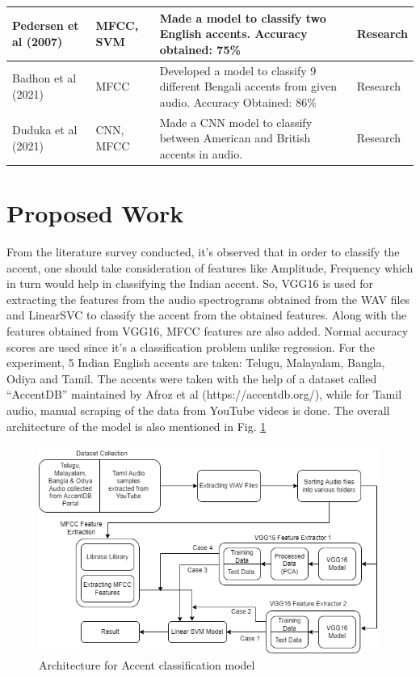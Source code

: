 \documentclass[pdflatex]{sn-jnl}%
\theoremstyle{thmstyleone}%
\theoremstyle{thmstyletwo}%
\theoremstyle{thmstylethree}%
\begin{document}
\begin{table}[!htp]
\begin{center}
{\begin{tabular}{p{3cm}p{3cm}p{4cm}p{3cm}}
			\hline
			Pedersen et al (2007) \cite{b16} & MFCC, SVM & Made a model to classify two English accents. Accuracy obtained: 75\% & Research \\
			\hline
			Badhon et al (2021) \cite{b17} & MFCC & Developed a model to classify 9 different Bengali accents from given audio. Accuracy Obtained: 86\% & Research \\
			\hline
			Duduka et al (2021) \cite{b19} & CNN, MFCC & Made a CNN model to classify between American and British accents in audio. & Research \\
			\hline
		\end{tabular}
	}
		\label{research1}
	\end{center}
\end{table}


\section{Proposed Work}\label{sec3}
From the literature survey conducted, it’s observed that in order to classify the accent, one should take consideration of features like Amplitude, Frequency which in turn would help in classifying the Indian accent. So, VGG16 is used for extracting the features from the audio spectrograms obtained from the WAV files and LinearSVC to classify the accent from
the obtained features. Along with the features obtained from VGG16, MFCC features are also added. Normal accuracy scores are used since it’s a classification problem unlike
regression. For the experiment, 5 Indian English accents are taken: Telugu, Malayalam, Bangla, Odiya and Tamil. The accents were taken with the help of a dataset called “AccentDB” maintained by Afroz et al \cite{b21} (https://accentdb.org/), while for Tamil audio, manual scraping of the data from YouTube videos is done. The overall architecture of the model is also
mentioned in Fig. \ref{model-dsa}


\begin{figure}[htbp]
	\centerline{\includegraphics[scale=0.52]{DSA Arch.drawio.png}}
	\caption{Architecture for Accent classification model}
	\label{model-dsa}
\end{figure}
\end{document}
